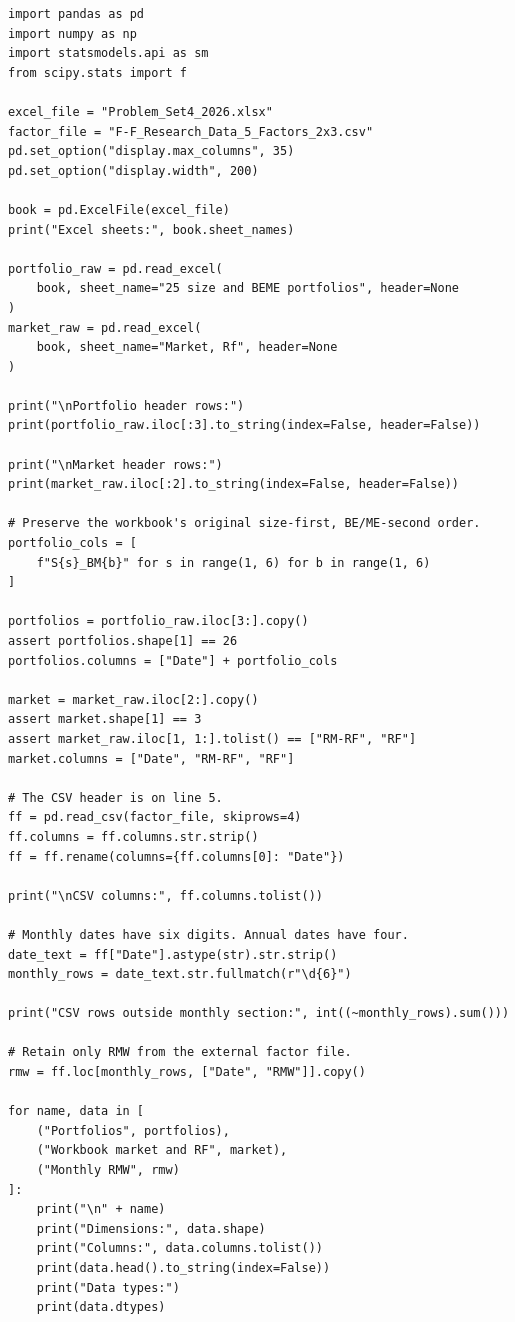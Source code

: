 \documentclass[11pt]{article}
\begin{document}
\begin{lstlisting}
import pandas as pd
import numpy as np
import statsmodels.api as sm
from scipy.stats import f

excel_file = "Problem_Set4_2026.xlsx"
factor_file = "F-F_Research_Data_5_Factors_2x3.csv"
pd.set_option("display.max_columns", 35)
pd.set_option("display.width", 200)

book = pd.ExcelFile(excel_file)
print("Excel sheets:", book.sheet_names)

portfolio_raw = pd.read_excel(
    book, sheet_name="25 size and BEME portfolios", header=None
)
market_raw = pd.read_excel(
    book, sheet_name="Market, Rf", header=None
)

print("\nPortfolio header rows:")
print(portfolio_raw.iloc[:3].to_string(index=False, header=False))

print("\nMarket header rows:")
print(market_raw.iloc[:2].to_string(index=False, header=False))

# Preserve the workbook's original size-first, BE/ME-second order.
portfolio_cols = [
    f"S{s}_BM{b}" for s in range(1, 6) for b in range(1, 6)
]

portfolios = portfolio_raw.iloc[3:].copy()
assert portfolios.shape[1] == 26
portfolios.columns = ["Date"] + portfolio_cols

market = market_raw.iloc[2:].copy()
assert market.shape[1] == 3
assert market_raw.iloc[1, 1:].tolist() == ["RM-RF", "RF"]
market.columns = ["Date", "RM-RF", "RF"]

# The CSV header is on line 5.
ff = pd.read_csv(factor_file, skiprows=4)
ff.columns = ff.columns.str.strip()
ff = ff.rename(columns={ff.columns[0]: "Date"})

print("\nCSV columns:", ff.columns.tolist())

# Monthly dates have six digits. Annual dates have four.
date_text = ff["Date"].astype(str).str.strip()
monthly_rows = date_text.str.fullmatch(r"\d{6}")

print("CSV rows outside monthly section:", int((~monthly_rows).sum()))

# Retain only RMW from the external factor file.
rmw = ff.loc[monthly_rows, ["Date", "RMW"]].copy()

for name, data in [
    ("Portfolios", portfolios),
    ("Workbook market and RF", market),
    ("Monthly RMW", rmw)
]:
    print("\n" + name)
    print("Dimensions:", data.shape)
    print("Columns:", data.columns.tolist())
    print(data.head().to_string(index=False))
    print("Data types:")
    print(data.dtypes)
\end{lstlisting}
\end{document}
